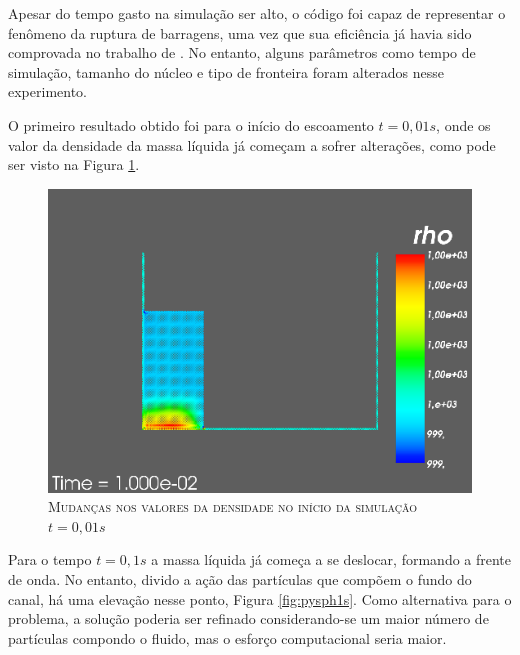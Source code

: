Apesar do tempo gasto na simulação ser alto, o código foi capaz de representar o fenômeno da ruptura de barragens, uma vez que sua eficiência já havia sido comprovada no trabalho de . No entanto, alguns parâmetros como tempo de simulação, tamanho do núcleo e tipo de fronteira foram alterados nesse experimento.

O primeiro resultado obtido foi para o início do escoamento $t=0,01s$, onde os valor da densidade da massa líquida já começam a sofrer alterações, como pode ser visto na Figura \ref{fig:pysph01s}.   

\begin{figure}[H]
	\centering
	\includegraphics[scale=0.5]{figuras/pysph01s.png}
	\caption{\textsc{Mudanças nos valores da densidade no início da simulação $t=0,01s$}}
	\vspace{-0.1cm}
	\label{fig:pysph01s}
\end{figure}

Para o tempo $t=0,1s$ a massa líquida já começa a se deslocar, formando a frente de onda. No entanto, divido a ação das partículas que compõem o fundo do canal, há uma elevação nesse ponto, Figura \ref{fig:pysph1s}. Como alternativa para o problema, a solução poderia ser refinado considerando-se um maior número de partículas compondo o fluido, mas o esforço computacional seria maior. 

